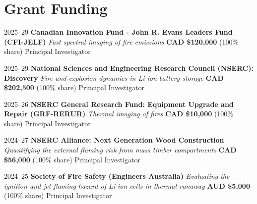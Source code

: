 \documentclass[12pt,letterpaper]{report}
\begin{document}
\section*{Grant Funding}

\begin{tablist}

    \item[2025--29] \tab \textbf{Canadian Innovation Fund - John R. Evans Leaders Fund (CFI-JELF)} \newline
    \textit{Fast spectral imaging of fire emissions} \newline
    \textbf{CAD \$120,000} (100\% share) \newline
    Principal Investigator  

    \item[2025--29] \tab \textbf{National Sciences and Engineering Research Council (NSERC): Discovery} \newline
    \textit{Fire and explosion dynamics in Li-ion battery storage} \newline
    \textbf{CAD \$202,500} (100\% share) \newline
    Principal Investigator  

    \item[2025--26] \tab \textbf{NSERC General Research Fund: Equipment Upgrade and Repair (GRF-RERUR)} \newline
    \textit{Thermal imaging of fires} \newline
    \textbf{CAD \$10,000} (100\% share) \newline
    Principal Investigator        

    \item[2024--27] \tab \textbf{NSERC Alliance: Next Generation Wood Construction} \newline
    \textit{Quantifying the external flaming risk from mass timber compartments} \newline
    \textbf{CAD \$56,000} (100\% share) \newline
    Principal Investigator  

    \item[2024--25] \tab \textbf{Society of Fire Safety (Engineers Australia)} \newline
    \textit{Evaluating the ignition and jet flaming hazard of Li-ion cells in thermal runaway} \newline
    \textbf{AUD \$5,000} (100\% share) \newline
    Principal Investigator  


\end{tablist}
\end{document}
